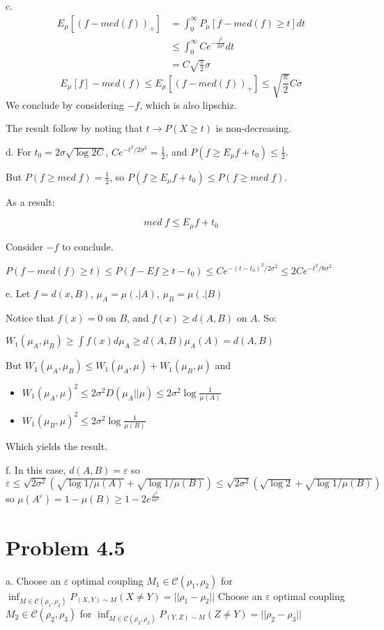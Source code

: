 \documentclass[11pt]{article}
\begin{document}
c. 
\begin{align*}
E_{\mu}[(f - med(f))_+]
&= \int_0^{\infty}  P_{\mu}[f - med(f) \ge t] dt
\\&\le \int_0^{\infty} Ce^{-\frac{t^2}{2\sigma^2}}  dt
\\&=   C \sqrt{\frac\pi 2} \sigma
\end{align*}
$$E_\mu[f] - med(f) \le E_\mu[(f - med(f))_+] \le \sqrt{\frac \pi 2} C \sigma$$
We conclude by considering \(-f\), which is also lipschiz.

The result follow by noting that \(t \rightarrow P(X \ge t)\) is non-decreasing.

d. 
For \(t_0 = 2\sigma \sqrt{\log 2C}\), \(Ce^{-t^2/2\sigma^2} = \frac12\), and \(P(f \ge E_\mu f + t_0) \le \frac12\).

But \(P(f \ge med \; f) = \frac12\), so \(P(f \ge E_\mu f + t_0) \le P(f \ge med \; f)\).

As a result:

$$med \; f \le E_\mu f + t_0$$

Consider \(-f\) to conclude.


\(P(f - med(f) \ge t) \le P(f - E f \ge t - t_0) \le Ce^{-(t-t_0)^2/2\sigma^2} \le 2Ce^{-t^2/8\sigma^2}\) 

e.
Let \(f = d(x, B)\), \(\mu_A = \mu(. | A)\), \(\mu_B = \mu(. | B)\)

Notice that \(f(x) = 0\) on \(B\), and \(f(x) \ge d(A, B)\) on \(A\). So:

\(W_1(\mu_A, \mu_B) \ge \int f(x) d\mu_A \ge d(A, B) \mu_A(A) = d(A, B)\)

But
\(W_1(\mu_A, \mu_B) \le W_1(\mu_A, \mu) + W_1(\mu_B, \mu)\)
and
\begin{itemize}
\item \(W_1(\mu_A, \mu)^2 \le 2\sigma^2 D(\mu_A || \mu) \le 2\sigma^2 \log \frac1{\mu(A)}\)
\item \(W_1(\mu_B, \mu)^2 \le 2\sigma^2 \log \frac1{\mu(B)}\)
\end{itemize}


Which yields the result.


f. In this case, \(d(A, B) = \varepsilon\)
so \(\varepsilon \le \sqrt{2\sigma^2} (\sqrt{\log1/\mu(A)} + \sqrt{\log1/\mu(B)}) \le  \sqrt{2\sigma^2} (\sqrt{\log2} + \sqrt{\log1/\mu(B)})\)
so \(\mu(A^{\varepsilon}) = 1- \mu(B) \ge 1 - 2e^{\frac{\varepsilon^2}{8\sigma^2}}\)



\section{Problem 4.5}
\label{sec:orgheadline4}
a.
Choose an \(\varepsilon\) optimal coupling \(M_1 \in \mathcal C(\rho_1, \rho_2)\) for \(\inf_{M \in \mathcal C(\rho_1, \rho_2)}P_{(X, Y) \sim M}(X \ne Y) = ||\rho_1 - \rho_2||\)
Choose an \(\varepsilon\) optimal coupling \(M_2 \in \mathcal C(\rho_2, \rho_3)\) for \(\inf_{M \in \mathcal C(\rho_2, \rho_2)}P_{(Y, Z) \sim M}(Z \ne Y) = ||\rho_2 - \rho_3||\)
\end{document}
